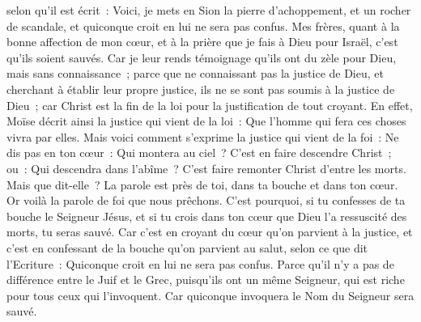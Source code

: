 \begin{multicols}{2}
selon qu'il est écrit~: Voici, je mets en Sion la pierre d'achoppement, et un rocher de scandale, et quiconque croit en lui ne sera pas confus.
\VerseOne{}Mes frères, quant à la bonne affection de mon cœur, et à la prière que je fais à Dieu pour Israël, c'est qu'ils soient sauvés.
Car je leur rends témoignage qu'ils ont du zèle pour Dieu, mais sans connaissance~;
parce que ne connaissant pas la justice de Dieu, et cherchant à établir leur propre justice, ils ne se sont pas soumis à la justice de Dieu~;
car Christ est la fin de la loi pour la justification de tout croyant.
En effet, Moïse décrit ainsi la justice qui vient de la loi~: Que l'homme qui fera ces choses vivra par elles.
Mais voici comment s'exprime la justice qui vient de la foi~: Ne dis pas en ton cœur~: Qui montera au ciel~? C'est en faire descendre Christ~;
ou~: Qui descendra dans l'abîme~? C'est faire remonter Christ d'entre les morts.
Mais que dit-elle~? La parole est près de toi, dans ta bouche et dans ton cœur. Or voilà la parole de foi que nous prêchons.
C'est pourquoi, si tu confesses de ta bouche le Seigneur Jésus, et si tu crois dans ton cœur que Dieu l'a ressuscité des morts, tu seras sauvé.
Car c'est en croyant du cœur qu'on parvient à la justice, et c'est en confessant de la bouche qu'on parvient au salut, selon ce que dit l'Ecriture~:
Quiconque croit en lui ne sera pas confus.
Parce qu'il n'y a pas de différence entre le Juif et le Grec, puisqu'ils ont un même Seigneur, qui est riche pour tous ceux qui l'invoquent.
Car quiconque invoquera le Nom du Seigneur sera sauvé.

\end{multicols}
